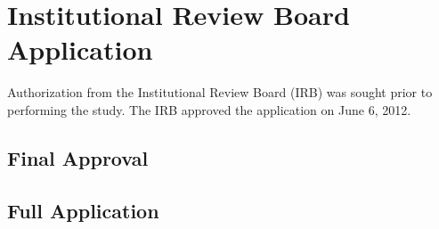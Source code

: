 \chapter{Institutional Review Board Application}
Authorization from the Institutional Review Board (IRB) was sought prior to performing the study. The IRB approved the application on June 6, 2012.

\section{Final Approval}


\section{Full Application}
